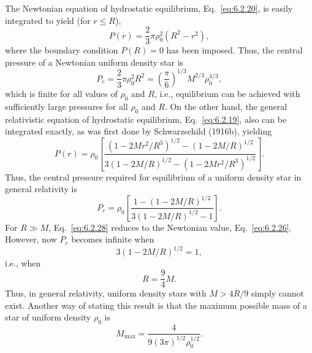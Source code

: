 The Newtonian equation of hydrostatic equilibrium, Eq.~\eqref{eq:6.2.20}, is
easily integrated to yield (for \(r\leq R\)),
\begin{equation}
  P(r)=\frac23\pi\rho_0^2(R^2-r^2),
  \tag{6.2.25}\label{eq:6.2.25}
\end{equation}
where the boundary condition \(P(R)=0\) has been imposed. Thus, the central
pressure of a Newtonian uniform density star is
\begin{equation}
  P_c=\frac23\pi\rho_0^2R^2
  =\left(\frac{\pi}{6}\right)^{1/3}M^{2/3}\rho_0^{4/3},
  \tag{6.2.26}\label{eq:6.2.26}
\end{equation}
which is finite for all values of \(\rho_0\) and \(R\), i.e., equilibrium can be
achieved with sufficiently large pressures for all \(\rho_0\) and \(R\). On the
other hand, the general relativistic equation of hydrostatic equilibrium,
Eq.~\eqref{eq:6.2.19}, also can be integrated exactly, as was first done by
Schwarzschild (1916b), yielding
\begin{equation}
  P(r)=\rho_0
  \left[
    \frac{(1-2Mr^2/R^3)^{1/2}-(1-2M/R)^{1/2}}
      {3(1-2M/R)^{1/2}-(1-2Mr^2/R^3)^{1/2}}
  \right].
  \tag{6.2.27}\label{eq:6.2.27}
\end{equation}
Thus, the central pressure required for equilibrium of a uniform density star in
general relativity is
\begin{equation}
  P_c=\rho_0
  \left[
    \frac{1-(1-2M/R)^{1/2}}{3(1-2M/R)^{1/2}-1}
  \right].
  \tag{6.2.28}\label{eq:6.2.28}
\end{equation}
For \(R\gg M\), Eq.~\eqref{eq:6.2.28} reduces to the Newtonian value,
Eq.~\eqref{eq:6.2.26}. However, now \(P_c\) becomes infinite when
\begin{equation}
  3(1-2M/R)^{1/2}=1,
  \tag{6.2.29}\label{eq:6.2.29}
\end{equation}
i.e., when
\begin{equation}
  R=\frac94M.
  \tag{6.2.30}\label{eq:6.2.30}
\end{equation}
Thus, in general relativity, uniform density stars with \(M>4R/9\) simply cannot
exist. Another way of stating this result is that the maximum possible mass of a
star of uniform density \(\rho_0\) is
\begin{equation}
  M_{\max}=\frac{4}{9(3\pi)^{1/2}\rho_0^{1/2}}.
  \tag{6.2.31}\label{eq:6.2.31}
\end{equation}

